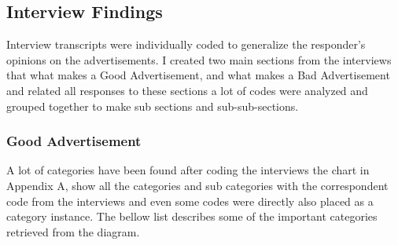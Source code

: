 \subsection{Interview Findings}
Interview transcripts were individually coded to generalize the responder's opinions on the advertisements. I created two main sections from the interviews that what makes a Good Advertisement, and what makes a Bad Advertisement and related all responses to these sections a lot of codes were analyzed and grouped together to make sub sections and sub-sub-sections.

\subsubsection{Good Advertisement}
A lot of categories have been found after coding the interviews the chart in Appendix A, show all the categories and sub categories with the correspondent code from the interviews and even some codes were directly also placed as a category instance. The bellow list describes some of the important categories retrieved from the diagram.


